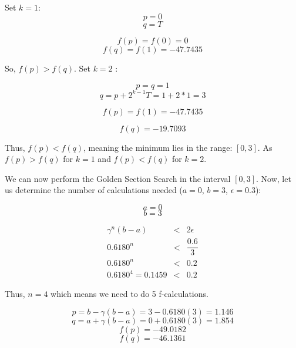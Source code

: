 \documentclass[a4paper]{article}
\begin{document}
Set $k = 1$:
\begin{equation}
p = 0
\end{equation}
\begin{equation}
q = T
\end{equation}

\begin{equation}
f(p) = f(0) =  0
\end{equation}
\begin{equation}
f(q) = f(1) = -47.7435
\end{equation}

So, $f(p) > f(q)$. Set $k = 2$ :

\begin{equation}
p = q = 1
\end{equation}
\begin{equation}
q = p + 2^{k - 1}T = 1 + 2*1 = 3
\end{equation}

\begin{equation}
f(p) = f(1) = -47.7435
\end{equation}

\begin{equation}
f(q) = -19.7093
\end{equation}


Thus, $ f(p) < f(q)$, meaning the minimum lies in the range: $[0, 3]$.  As $f(p) > f(q)$ for $k = 1$  and $f(p) < f(q)$ for $k = 2$.

We can now perform the Golden Section Search in the interval $[0, 3]$. Now, let us determine the number of calculations needed ($a = 0$, $b = 3$, $\epsilon = 0.3$):

\begin{equation}
a = 0
\end{equation}
\begin{equation}
b = 3
\end{equation}

\begin{eqnarray}
\gamma^n (b - a) &<& 2\epsilon\\ 
0.6180^n &<& \dfrac{0.6}{3}\\
0.6180^n &<& 0.2 \\
0.6180^4 = 0.1459 &<& 0.2
\end{eqnarray}

Thus, $ n = 4 $ which means we need to do 5 f-calculations.

\begin{equation}
p = b - \gamma(b - a) = 3 - 0.6180(3) = 1.146
\end{equation}
\begin{equation}
q = a + \gamma(b - a) = 0 + 0.6180(3) = 1.854
\end{equation}
\begin{equation}
f(p) = -49.0182
\end{equation}
\begin{equation}
f(q) = -46.1361
\end{equation}
\end{document}
